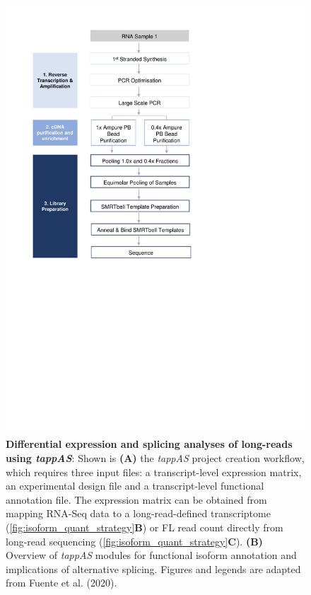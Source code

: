 \begin{figure}[htp]
	\begin{center}
		\includegraphics[page=21,trim={0cm 5cm 0 0cm},clip, scale = 0.8]{Figures/ProjectDevelopment_Figures.pdf}
	\end{center}
	\captionsetup{width=0.95\textwidth,singlelinecheck=off}
	\caption[Differential expression and splicing analyses of long-reads using \textit{tappAS}]%
	{\textbf{Differential expression and splicing analyses of long-reads using \textit{tappAS}}: Shown is \textbf{(A)} the \textit{tappAS} project creation workflow, which requires three input files: a transcript-level expression matrix, an experimental design file and a transcript-level functional annotation file. The expression matrix can be obtained from mapping RNA-Seq data to a long-read-defined transcriptome (\cref{fig:isoform_quant_strategy}\textbf{B}) or FL read count directly from long-read sequencing (\cref{fig:isoform_quant_strategy}\textbf{C}). \textbf{(B)} Overview of \textit{tappAS} modules for functional isoform annotation and implications of alternative splicing. Figures and legends are adapted from Fuente et al. (2020)\cite{DeLaFuente2020}.
	}
	\label{fig:tappAS_overview}
\end{figure}

